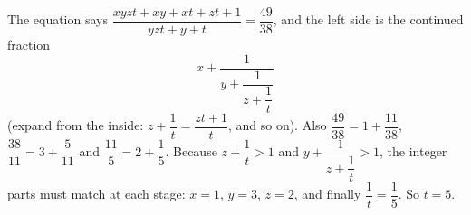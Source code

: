 The equation says $\dfrac{xyzt+xy+xt+zt+1}{yzt+y+t}=\dfrac{49}{38}$, and the left side is the continued fraction
\[x+\dfrac{1}{y+\dfrac{1}{z+\dfrac{1}{t}}}\]
(expand from the inside: $z+\dfrac1t=\dfrac{zt+1}{t}$, and so on). Also $\dfrac{49}{38}=1+\dfrac{11}{38}$, $\dfrac{38}{11}=3+\dfrac5{11}$ and $\dfrac{11}{5}=2+\dfrac15$. Because $z+\dfrac1t>1$ and $y+\dfrac{1}{z+\dfrac1t}>1$, the integer parts must match at each stage: $x=1$, $y=3$, $z=2$, and finally $\dfrac1t=\dfrac15$. So $t=\boxed{5}$.
